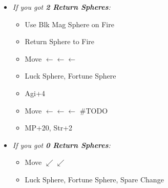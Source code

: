\begin{spheregrid}
\begin{itemize}
\begin{itemize}
            \item \textit{If you got \textbf{2 Return Spheres}:}
                \begin{itemize}
                    \item Use Blk Mag Sphere on Fire
                    \item Return Sphere to Fire
                    \item Move $\leftarrow\leftarrow\leftarrow$
                    \item Luck Sphere, Fortune Sphere
                    \item Agi+4
                    \item Move $\leftarrow\leftarrow\leftarrow$ \#TODO
                    \item MP+20, Str+2
                \end{itemize}
            \item \textit{If you got \textbf{0 Return Spheres}:}
                \begin{itemize}
                    \item Move $\swarrow\swarrow$
                    \item Luck Sphere, Fortune Sphere, Spare Change

\end{itemize}
\end{itemize}
\end{itemize}
\end{spheregrid}
